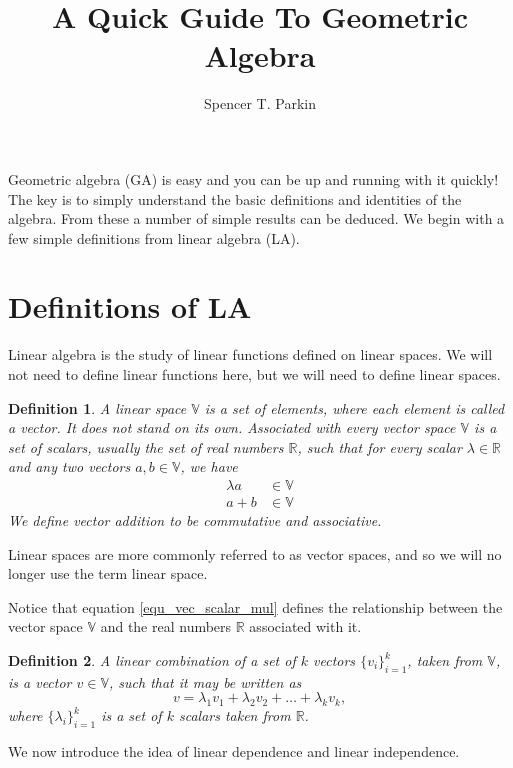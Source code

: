 \documentclass[12pt]{article}
\title{A Quick Guide To Geometric Algebra}
\author{Spencer T. Parkin}
\newcommand{\V}{\mathbb{V}}
\newcommand{\R}{\mathbb{R}}
\newtheorem{definition}{Definition}[section]
\begin{document}
\maketitle

Geometric algebra (GA) is easy and you can be up and running with it quickly!  The key is to
simply understand the basic definitions and identities of the algebra.  From these a number
of simple results can be deduced.  We begin with a few simple definitions from linear algebra (LA).

\section{Definitions of LA}

Linear algebra is the study of linear functions defined on linear spaces.  We will not need
to define linear functions here, but we will need to define linear spaces.
\begin{definition}\label{def_vec_space}
A linear space $\V$ is a set of elements, where each element is called a vector.  It does not stand on its own.
Associated with every vector space $\V$ is a set of scalars, usually the set of real numbers $\R$,
such that for every scalar $\lambda\in\R$ and any two vectors $a,b\in\V$, we have
\begin{align}
\lambda a &\in \V \\\label{equ_vec_scalar_mul}
a+b &\in\V
\end{align}
We define vector addition to be commutative and associative.
\end{definition}
Linear spaces are more commonly referred to as vector spaces, and so we will no longer
use the term linear space.

Notice that equation \eqref{equ_vec_scalar_mul} defines the relationship between the
vector space $\V$ and the real numbers $\R$ associated with it.

\begin{definition}
A linear combination of a set of $k$ vectors $\{v_i\}_{i=1}^k$, taken from $\V$, is
a vector $v\in\V$, such that it may be written as
\begin{equation}
v = \lambda_1 v_1 + \lambda_2 v_2 + \dots + \lambda_k v_k,
\end{equation}
where $\{\lambda_i\}_{i=1}^k$ is a set of $k$ scalars taken from $\R$.
\end{definition}

We now introduce the idea of linear dependence and linear independence.
\end{document}
